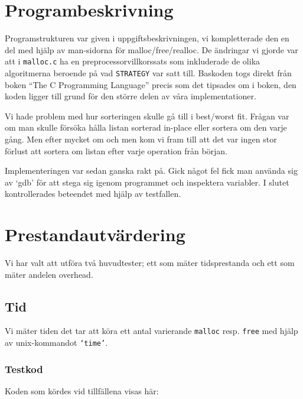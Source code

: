 \documentclass[a4paper,10pt,titlepage]{article}
\begin{document}
\newpage
\section{Programbeskrivning}

Programstrukturen var given i uppgiftsbeskrivningen, vi kompletterade den en del med hjälp av man-sidorna för malloc/free/realloc.
De ändringar vi gjorde var att i \texttt{malloc.c} ha en preprocessorvillkorssats som inkluderade de olika algoritmerna beroende på vad \texttt{STRATEGY} var satt till. Baskoden togs direkt från boken ``The C Programming Language'' precis som det tipsades om i boken, den koden ligger till grund för den större delen av våra implementationer.

Vi hade problem med hur sorteringen skulle gå till i best/worst fit. Frågan var om man skulle försöka hålla listan sorterad in-place eller sortera om den varje gång. Men efter mycket om och men kom vi fram till att det var ingen stor förlust att sortera om listan efter varje operation från början.

Implementeringen var sedan ganska rakt på. Gick något fel fick man använda sig av `gdb' för att stega sig igenom programmet och inspektera variabler. I slutet kontrollerades beteendet med hjälp av testfallen.

\newpage
\section{Prestandautvärdering}


Vi har valt att utföra två huvudtester; ett som mäter tidsprestanda och ett som mäter andelen overhead.

\subsection{Tid}

Vi mäter tiden det tar att köra ett antal varierande \texttt{malloc} resp. \texttt{free} med hjälp av unix-kommandot \texttt{`time'}.


\subsubsection{Testkod}

Koden som kördes vid tillfällena visas här:

\scriptsize{}
\normalsize
\end{document}
